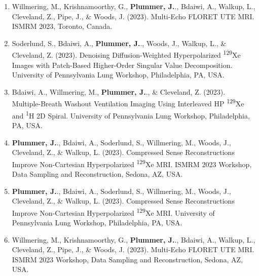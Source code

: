 \documentclass[12pt,]{scrartcl}
\begin{document}
\begin{enumerate}
  \item Willmering, M., Krishnamoorthy, G., \textbf{Plummer, J.}., Bdaiwi, A., Walkup, L., Cleveland, Z., Pipe, J., \& Woods, J. (2023). Multi-Echo FLORET UTE MRI. ISMRM 2023, Toronto, Canada.

  \item Soderlund, S., Bdaiwi, A., \textbf{Plummer, J.}., Woods, J., Walkup, L., \& Cleveland, Z. (2023). Denoising Diffusion-Weighted Hyperpolarized \textsuperscript{129}Xe Images with Patch-Based Higher-Order Singular Value Decomposition. University of Pennsylvania Lung Workshop, Philadelphia, PA, USA.
  
  \item Bdaiwi, A., Willmering, M., \textbf{Plummer, J.}., \& Cleveland, Z. (2023). Multiple-Breath Washout Ventilation Imaging Using Interleaved HP \textsuperscript{129}Xe and \textsuperscript{1}H 2D Spiral. University of Pennsylvania Lung Workshop, Philadelphia, PA, USA.
  
  \item \textbf{Plummer, J.}., Bdaiwi, A., Soderlund, S., Willmering, M., Woods, J., Cleveland, Z., \& Walkup, L. (2023). Compressed Sense Reconstructions Improve Non-Cartesian Hyperpolarized \textsuperscript{129}Xe MRI. ISMRM 2023 Workshop, Data Sampling and Reconstruction, Sedona, AZ, USA.  
  
  \item \textbf{Plummer, J.}., Bdaiwi, A., Soderlund, S., Willmering, M., Woods, J., Cleveland, Z., \& Walkup, L. (2023). Compressed Sense Reconstructions Improve Non-Cartesian Hyperpolarized \textsuperscript{129}Xe MRI. University of Pennsylvania Lung Workshop, Philadelphia, PA, USA.  
  
  \item Willmering, M., Krishnamoorthy, G., \textbf{Plummer, J.}., Bdaiwi, A., Walkup, L., Cleveland, Z., Pipe, J., \& Woods, J. (2023). Multi-Echo FLORET UTE MRI. ISMRM 2023 Workshop, Data Sampling and Reconstruction, Sedona, AZ, USA.  
  

\end{enumerate}
\end{document}
